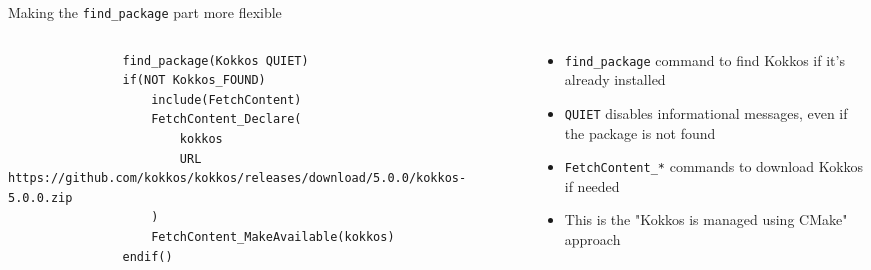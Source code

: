 \documentclass[
    aspectratio=169,
    \createHandout
]{beamer}
\begin{document}
\begin{frame}[fragile]{Making the \texttt{find\_package} part more flexible}
    \begin{columns}
        \begin{column}{0.6\linewidth}
            \begin{verbatim}
                find_package(Kokkos QUIET)
                if(NOT Kokkos_FOUND)
                    include(FetchContent)
                    FetchContent_Declare(
                        kokkos
                        URL https://github.com/kokkos/kokkos/releases/download/5.0.0/kokkos-5.0.0.zip
                    )
                    FetchContent_MakeAvailable(kokkos)
                endif()
            \end{verbatim}
        \end{column}
        \begin{column}{0.4\linewidth}
            \begin{itemize}
                \item \texttt{find\_package} command to find Kokkos if it's already installed
                \item \texttt{QUIET} disables informational messages, even if the package is not found
                \item \texttt{FetchContent\_*} commands to download Kokkos if needed
                \item This is the "Kokkos is managed using CMake" approach
            \end{itemize}
        \end{column}
    \end{columns}
\end{frame}

\end{document}
